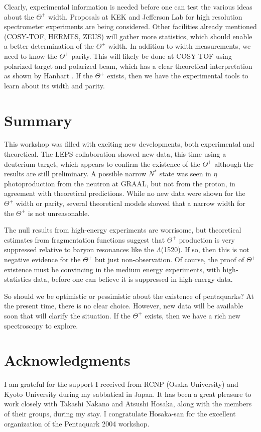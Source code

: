 \documentclass{ws-procs9x6}
\newcommand{\thp}{$\Theta^+$ }
\begin{document}
Clearly, experimental information is needed before one can 
test the various ideas about the \thp width.  Proposals at 
KEK \cite{imai} and Jefferson Lab \cite{bogdan} for high 
resolution spectrometer experiments are being considered. 
Other facilities already mentioned (COSY-TOF, HERMES, ZEUS) 
will gather more statistics, which should enable a 
better determination of the \thp width.  In addition to 
width measurements, we need to know the \thp parity.  This 
will likely be done at COSY-TOF \cite{eyrich} using polarized 
target and polarized beam, which has a clear theoretical 
interpretation as shown by Hanhart \cite{hanhart}. If the 
\thp exists, then we have the experimental tools to learn 
about its width and parity.


\section{ Summary }

This workshop was filled with exciting new developments, both 
experimental and theoretical.  The LEPS collaboration showed 
new data, this time using a deuterium target, which appears 
to confirm the existence of the \thp although the results are 
still preliminary. A possible narrow $N^*$ state was seen in 
$\eta$ photoproduction from the neutron at GRAAL, but not from 
the proton, in agreement with theoretical predictions. While 
no new data were shown for the \thp width or parity, 
several theoretical models showed that a narrow width for the 
\thp is not unreasonable.  

The null results from high-energy experiments are worrisome, 
but theoretical estimates from fragmentation functions suggest 
that \thp production is very suppressed relative 
to baryon resonances like the $\Lambda$(1520).  If so, then 
this is not negative evidence for the \thp but just non-observation. 
Of course, the proof of \thp existence must be convincing in the 
medium energy experiments, with high-statistics data, before 
one can believe it is suppressed in high-energy data. 

So should we be optimistic or pessimistic about the existence of 
pentaquarks?  At the present time, there is no clear choice. 
However, new data will be available soon that will clarify 
the situation.  If the \thp exists, then we have a rich new 
spectroscopy to explore.


\section*{Acknowledgments}
I am grateful for the support I received from RCNP (Osaka University) 
and Kyoto University during my sabbatical in Japan.  It has been 
a great pleasure to work closely with Takashi Nakano and Atsushi 
Hosaka, along with the members of their groups, during my stay. 
I congratulate Hosaka-san for the excellent organization of the 
Pentaquark 2004 workshop.
\end{document}
